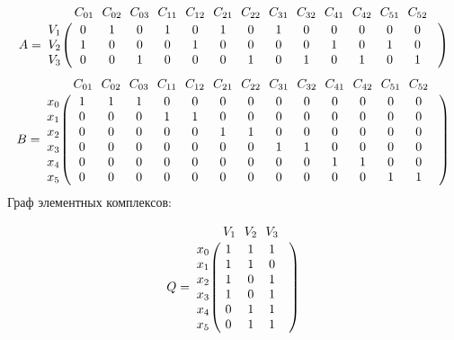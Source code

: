 \documentclass{article}
\begin{document}
\begin{figure}[h]
\end{figure}
$$
 A =
\bordermatrix{ & C_{01} \!&\! C_{02} \!&\! C_{03} \!&\! C_{11} \!&\! C_{12} \!&\! C_{21} \!&\! C_{22} \!&\! C_{31} \!&\! C_{32} \!&\! C_{41} \!&\! C_{42} \!&\! C_{51} \!&\! C_{52} \!&\! \cr 
V_{1} \!&\! 0 \!&\! 1 \!&\! 0 \!&\! 1 \!&\! 0 \!&\! 1 \!&\! 0 \!&\! 1 \!&\! 0 \!&\! 0 \!&\! 0 \!&\! 0 \!&\! 0 \!&\! \cr
V_{2} \!&\! 1 \!&\! 0 \!&\! 0 \!&\! 0 \!&\! 1 \!&\! 0 \!&\! 0 \!&\! 0 \!&\! 0 \!&\! 1 \!&\! 0 \!&\! 1 \!&\! 0 \!&\! \cr
V_{3} \!&\! 0 \!&\! 0 \!&\! 1 \!&\! 0 \!&\! 0 \!&\! 0 \!&\! 1 \!&\! 0 \!&\! 1 \!&\! 0 \!&\! 1 \!&\! 0 \!&\! 1 \!&\! \cr
}$$
$$
B =
\bordermatrix{ & C_{01} \!&\! C_{02} \!&\! C_{03} \!&\! C_{11} \!&\! C_{12} \!&\! C_{21} \!&\! C_{22} \!&\! C_{31} \!&\! C_{32} \!&\! C_{41} \!&\! C_{42} \!&\! C_{51} \!&\! C_{52} \!&\! \cr 
x_{0} \!&\! 1 \!&\! 1 \!&\! 1 \!&\! 0 \!&\! 0 \!&\! 0 \!&\! 0 \!&\! 0 \!&\! 0 \!&\! 0 \!&\! 0 \!&\! 0 \!&\! 0 \!&\! \cr
x_{1} \!&\! 0 \!&\! 0 \!&\! 0 \!&\! 1 \!&\! 1 \!&\! 0 \!&\! 0 \!&\! 0 \!&\! 0 \!&\! 0 \!&\! 0 \!&\! 0 \!&\! 0 \!&\! \cr
x_{2} \!&\! 0 \!&\! 0 \!&\! 0 \!&\! 0 \!&\! 0 \!&\! 1 \!&\! 1 \!&\! 0 \!&\! 0 \!&\! 0 \!&\! 0 \!&\! 0 \!&\! 0 \!&\! \cr
x_{3} \!&\! 0 \!&\! 0 \!&\! 0 \!&\! 0 \!&\! 0 \!&\! 0 \!&\! 0 \!&\! 1 \!&\! 1 \!&\! 0 \!&\! 0 \!&\! 0 \!&\! 0 \!&\! \cr
x_{4} \!&\! 0 \!&\! 0 \!&\! 0 \!&\! 0 \!&\! 0 \!&\! 0 \!&\! 0 \!&\! 0 \!&\! 0 \!&\! 1 \!&\! 1 \!&\! 0 \!&\! 0 \!&\! \cr
x_{5} \!&\! 0 \!&\! 0 \!&\! 0 \!&\! 0 \!&\! 0 \!&\! 0 \!&\! 0 \!&\! 0 \!&\! 0 \!&\! 0 \!&\! 0 \!&\! 1 \!&\! 1 \!&\! \cr
}$$
Граф элементных комплексов:
\begin{figure}[h]
\end{figure}
$$
Q =
\bordermatrix{ & V_{1} \!&\! V_{2} \!&\! V_{3} \!&\! \cr 
x_{0} \!&\! 1 \!&\! 1 \!&\! 1 \!&\! \cr
x_{1} \!&\! 1 \!&\! 1 \!&\! 0 \!&\! \cr
x_{2} \!&\! 1 \!&\! 0 \!&\! 1 \!&\! \cr
x_{3} \!&\! 1 \!&\! 0 \!&\! 1 \!&\! \cr
x_{4} \!&\! 0 \!&\! 1 \!&\! 1 \!&\! \cr
x_{5} \!&\! 0 \!&\! 1 \!&\! 1 \!&\! \cr
}$$
\end{document}
